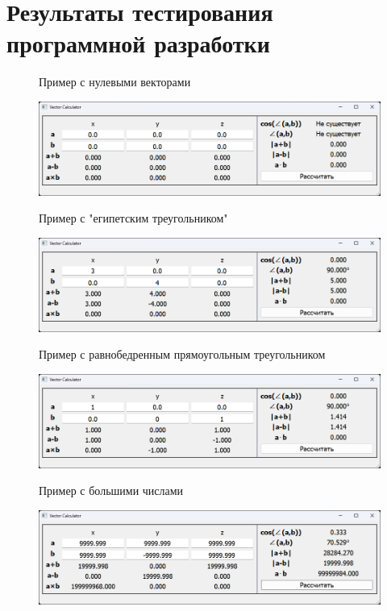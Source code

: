 \label{sec:testing}
\section{Результаты тестирования программной разработки}


\begin{figure}[H]
    Пример с нулевыми векторами
    \vspace{0.3cm}
    

    \includegraphics[width=\textwidth]{img//test1}
    \caption{}
\end{figure}

\begin{figure}[H]
    Пример с "египетским треугольником"
    \vspace{0.3cm}
    

    \includegraphics[width=\textwidth]{img//test2}
    \caption{}
\end{figure}

\begin{figure}[H]
    Пример с равнобедренным прямоугольным треугольником
    \vspace{0.3cm}
    

    \includegraphics[width=\textwidth]{img//test3}
    \caption{}
\end{figure}

\begin{figure}[H]
    Пример с большими числами
    \vspace{0.3cm}
    

    \includegraphics[width=\textwidth]{img//test4}
    \caption{}
\end{figure}